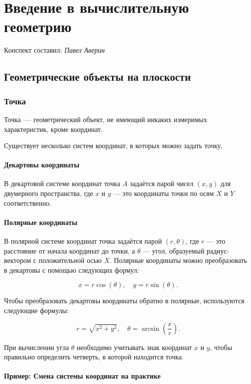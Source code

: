 \section{Введение в вычислительную геометрию}
\begin{center}
    Конспект составил: \textit{Павел Аверин}
\end{center}

\subsection{Геометрические объекты на плоскости}

\subsubsection{Точка}
Точка~--- геометрический объект, не имеющий никаких измеримых характеристик, кроме координат.

Существует несколько систем координат, в которых можно задать точку.

\paragraph{Декартовы координаты}
В декартовой системе координат точка $A$ задаётся парой чисел $(x, y)$ для двумерного пространства, где $x$ и $y$ — это координаты точки по осям $X$ и $Y$ соответственно.

\paragraph{Полярные координаты}
В полярной системе координат точка задаётся парой $(r, \theta)$, где $r$ — это расстояние от начала координат до точки, а $\theta$ — угол, образуемый радиус-вектором с положительной осью $X$. Полярные координаты можно преобразовать в декартовы с помощью следующих формул:

\[
    x = r \cos(\theta), \quad y = r \sin(\theta).
\]

Чтобы преобразовать декартовы координаты обратно в полярные, используются следующие формулы:

\[
    r = \sqrt{x^2 + y^2}, \quad \theta = \arcsin\left(\frac{x}{r}\right).
\]

При вычислении угла $\theta$ необходимо учитывать знак координат $x$ и $y$, чтобы правильно определить четверть, в которой находится точка.

\paragraph*{Пример: Смена системы координат на практике}

